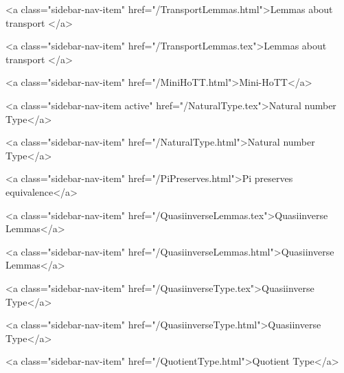       
        
          <a class="sidebar-nav-item" href="/TransportLemmas.html">Lemmas about transport </a>
        
      
    
      
        
          <a class="sidebar-nav-item" href="/TransportLemmas.tex">Lemmas about transport </a>
        
      
    
      
        
          <a class="sidebar-nav-item" href="/MiniHoTT.html">Mini-HoTT</a>
        
      
    
      
        
          <a class="sidebar-nav-item active" href="/NaturalType.tex">Natural number Type</a>
        
      
    
      
        
          <a class="sidebar-nav-item" href="/NaturalType.html">Natural number Type</a>
        
      
    
      
        
          <a class="sidebar-nav-item" href="/PiPreserves.html">Pi preserves equivalence</a>
        
      
    
      
        
          <a class="sidebar-nav-item" href="/QuasiinverseLemmas.tex">Quasiinverse Lemmas</a>
        
      
    
      
        
          <a class="sidebar-nav-item" href="/QuasiinverseLemmas.html">Quasiinverse Lemmas</a>
        
      
    
      
        
          <a class="sidebar-nav-item" href="/QuasiinverseType.tex">Quasiinverse Type</a>
        
      
    
      
        
          <a class="sidebar-nav-item" href="/QuasiinverseType.html">Quasiinverse Type</a>
        
      
    
      
        
          <a class="sidebar-nav-item" href="/QuotientType.html">Quotient Type</a>
        
